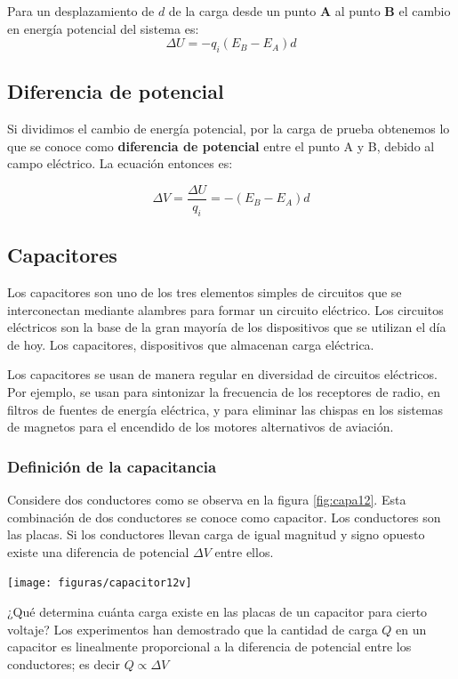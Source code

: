 \documentclass{article}
\begin{document}
Para un desplazamiento de $d$ de la carga desde un punto \textbf{A} al punto \textbf{B} el cambio en energía potencial del sistema es:
$$ \Delta U = -q_i (E_B - E_A)d$$

	\subsection{Diferencia de potencial}
Si dividimos el cambio de energía potencial, por la carga de prueba obtenemos lo que se conoce como \textbf{diferencia de potencial} entre el punto A y B, debido al campo eléctrico. La ecuación entonces es:

$$ \Delta V = \frac{\Delta U}{q_i} = -(E_B - E_A)d $$ 

\subsection{Capacitores}
Los capacitores son uno de los tres elementos simples de circuitos que se interconectan mediante alambres para formar un circuito eléctrico. Los circuitos eléctricos son la base de la gran mayoría de los dispositivos que se utilizan el día de hoy. 
Los capacitores, dispositivos que almacenan carga eléctrica.


Los capacitores se usan de manera regular en diversidad de circuitos eléctricos. Por ejemplo, se usan para sintonizar la frecuencia de los receptores de radio, en filtros de fuentes de energía eléctrica, y para eliminar las chispas en los sistemas de magnetos  para el encendido de los motores alternativos de aviación.

\subsubsection*{Definición de la capacitancia}

Considere dos conductores como se observa en la figura \ref{fig:capa12}. Esta combinación de dos conductores se conoce como capacitor. Los conductores son las placas. Si los conductores llevan carga de igual magnitud y signo opuesto existe una diferencia de potencial $\Delta V$ entre ellos.


\begin{center}
	\texttt{[image: figuras/capacitor12v]}
\label{fig:capa12}
\end{center}

¿Qué determina cuánta carga existe en las placas de un capacitor para cierto voltaje? Los experimentos han demostrado que la cantidad de carga $Q$ en un capacitor es linealmente proporcional a la diferencia de potencial entre los conductores; es decir $Q \propto \Delta V$
\end{document}
